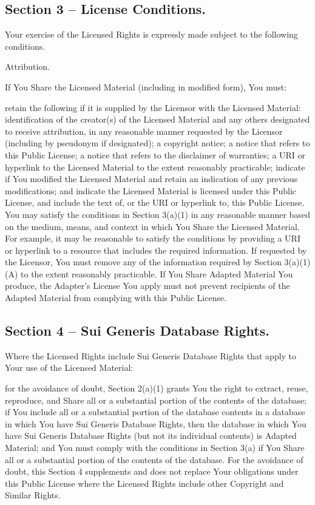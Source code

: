 \subsection{Section 3 – License Conditions.}

Your exercise of the Licensed Rights is expressly made subject to the following conditions.

Attribution.

If You Share the Licensed Material (including in modified form), You must:

retain the following if it is supplied by the Licensor with the Licensed Material:
identification of the creator(s) of the Licensed Material and any others designated to receive attribution, in any reasonable manner requested by the Licensor (including by pseudonym if designated);
a copyright notice;
a notice that refers to this Public License;
a notice that refers to the disclaimer of warranties;
a URI or hyperlink to the Licensed Material to the extent reasonably practicable;
indicate if You modified the Licensed Material and retain an indication of any previous modifications; and
indicate the Licensed Material is licensed under this Public License, and include the text of, or the URI or hyperlink to, this Public License.
You may satisfy the conditions in Section 3(a)(1) in any reasonable manner based on the medium, means, and context in which You Share the Licensed Material. For example, it may be reasonable to satisfy the conditions by providing a URI or hyperlink to a resource that includes the required information.
If requested by the Licensor, You must remove any of the information required by Section 3(a)(1)(A) to the extent reasonably practicable.
If You Share Adapted Material You produce, the Adapter's License You apply must not prevent recipients of the Adapted Material from complying with this Public License.

\subsection{Section 4 – Sui Generis Database Rights.}

Where the Licensed Rights include Sui Generis Database Rights that apply to Your use of the Licensed Material:

for the avoidance of doubt, Section 2(a)(1) grants You the right to extract, reuse, reproduce, and Share all or a substantial portion of the contents of the database;
if You include all or a substantial portion of the database contents in a database in which You have Sui Generis Database Rights, then the database in which You have Sui Generis Database Rights (but not its individual contents) is Adapted Material; and
You must comply with the conditions in Section 3(a) if You Share all or a substantial portion of the contents of the database.
For the avoidance of doubt, this Section 4 supplements and does not replace Your obligations under this Public License where the Licensed Rights include other Copyright and Similar Rights.

